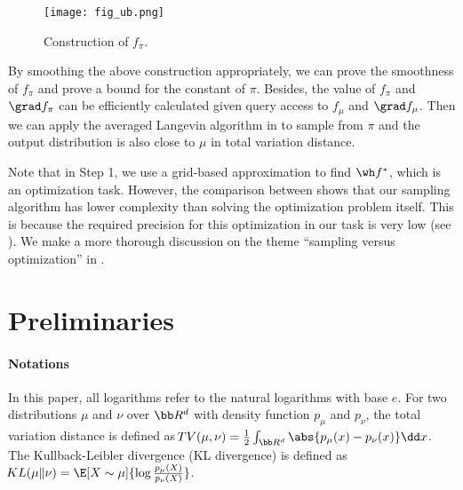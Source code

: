 \documentclass[11pt,a4paper]{article}
\newcommand{\DTV}{\!{TV}}
\begin{document}
\begin{figure}[h!]
	\centering
    \texttt{[image: fig\_ub.png]}
  \caption{Construction of $f_{\pi}$.}
  \label{fig:ub}
\end{figure}

By smoothing the above construction appropriately, we can prove the smoothness of $f_{\pi}$ and prove a bound for the \Poincare constant of $\pi$. Besides, the value of $f_{\pi}$ and $\grad f_{\pi}$ can be efficiently calculated given query access to $f_{\mu}$ and $\grad f_{\mu}$. Then we can apply the averaged Langevin algorithm in \cite{BCE+22} to sample from $\pi$ and the output distribution is also close to $\mu$ in total variation distance.

Note that in Step 1, we use a grid-based approximation to find $\wh f^*$, which is an optimization task. However, the comparison between  shows that our sampling algorithm has lower complexity than solving the optimization problem itself. This is because the required precision for this optimization in our task is very low (see ). We make a more thorough discussion on the theme ``sampling versus optimization'' in .





\section{Preliminaries}

\paragraph{Notations}
In this paper, all logarithms refer to the natural logarithms with base $e$. 
For two distributions $\mu$ and $\nu$ over $\bb R^d$ with density function $p_{\mu}$ and $p_{\nu}$, the total variation distance is defined as $\DTV(\mu,\nu)=\frac{1}{2}\int_{\bb R^d}\abs{p_\mu(x)-p_\nu(x)}\dd x$. The Kullback-Leibler divergence (KL divergence) is defined as $\!{KL}(\mu\|\nu)=\E[X\sim \mu]{\log \frac{p_\mu(X)}{p_\nu(X)}}$. 
\end{document}
